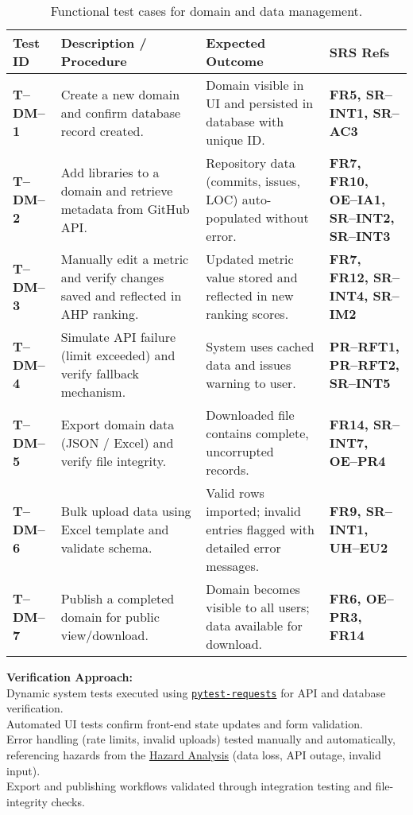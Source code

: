 \documentclass[12pt, titlepage]{article}
\begin{document}
\begin{table}[H]
\centering
\begin{tabularx}{\textwidth}{|l|X|X|X|}
\hline
\textbf{Test ID} & \textbf{Description / Procedure} & \textbf{Expected Outcome} & \textbf{SRS Refs} \\
\hline
\textbf{T--DM--1} &
Create a new domain and confirm database record created. &
Domain visible in UI and persisted in database with unique ID. &
\textbf{FR5, SR--INT1, SR--AC3} \\
\hline
\textbf{T--DM--2} &
Add libraries to a domain and retrieve metadata from GitHub API. &
Repository data (commits, issues, LOC) auto-populated without error. &
\textbf{FR7, FR10, OE--IA1, SR--INT2, SR--INT3} \\
\hline
\textbf{T--DM--3} &
Manually edit a metric and verify changes saved and reflected in AHP ranking. &
Updated metric value stored and reflected in new ranking scores. &
\textbf{FR7, FR12, SR--INT4, SR--IM2} \\
\hline
\textbf{T--DM--4} &
Simulate API failure (limit exceeded) and verify fallback mechanism. &
System uses cached data and issues warning to user. &
\textbf{PR--RFT1, PR--RFT2, SR--INT5} \\
\hline
\textbf{T--DM--5} &
Export domain data (JSON / Excel) and verify file integrity. &
Downloaded file contains complete, uncorrupted records. &
\textbf{FR14, SR--INT7, OE--PR4} \\
\hline
\textbf{T--DM--6} &
Bulk upload data using Excel template and validate schema. &
Valid rows imported; invalid entries flagged with detailed error messages. &
\textbf{FR9, SR--INT1, UH--EU2} \\
\hline
\textbf{T--DM--7} &
Publish a completed domain for public view/download. &
Domain becomes visible to all users; data available for download. &
\textbf{FR6, OE--PR3, FR14} \\
\hline
\end{tabularx}
\caption{Functional test cases for domain and data management.}
\end{table}

\noindent\textbf{Verification Approach:}\\
Dynamic system tests executed using \texttt{\href{https://docs.pytest.org/en/stable/}{pytest-requests}} for API and database verification.\\
Automated UI tests confirm front-end state updates and form validation.\\
Error handling (rate limits, invalid uploads) tested manually and automatically, referencing hazards from the \href{https://github.com/thaafei/DomainX/blob/main/docs/HazardAnalysis/HazardAnalysis.pdf}{Hazard Analysis} (data loss, API outage, invalid input).\\
Export and publishing workflows validated through integration testing and file-integrity checks.\\[0.5em]
\end{document}
